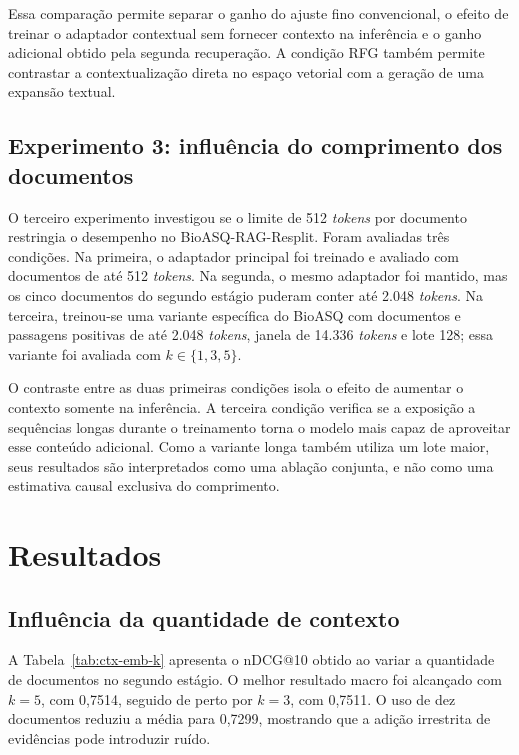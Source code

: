 Essa comparação permite separar o ganho do ajuste fino convencional, o efeito de treinar o adaptador contextual sem fornecer contexto na inferência e o ganho adicional obtido pela segunda recuperação. A condição RFG também permite contrastar a contextualização direta no espaço vetorial com a geração de uma expansão textual.

\subsection{Experimento 3: influência do comprimento dos documentos}

O terceiro experimento investigou se o limite de 512 \textit{tokens} por documento restringia o desempenho no BioASQ-RAG-Resplit. Foram avaliadas três condições. Na primeira, o adaptador principal foi treinado e avaliado com documentos de até 512 \textit{tokens}. Na segunda, o mesmo adaptador foi mantido, mas os cinco documentos do segundo estágio puderam conter até 2.048 \textit{tokens}. Na terceira, treinou-se uma variante específica do BioASQ com documentos e passagens positivas de até 2.048 \textit{tokens}, janela de 14.336 \textit{tokens} e lote 128; essa variante foi avaliada com $k\in\{1,3,5\}$.

O contraste entre as duas primeiras condições isola o efeito de aumentar o contexto somente na inferência. A terceira condição verifica se a exposição a sequências longas durante o treinamento torna o modelo mais capaz de aproveitar esse conteúdo adicional. Como a variante longa também utiliza um lote maior, seus resultados são interpretados como uma ablação conjunta, e não como uma estimativa causal exclusiva do comprimento.

\section{Resultados}
\label{sec:ctx-emb-resultados}

\subsection{Influência da quantidade de contexto}

A Tabela~\ref{tab:ctx-emb-k} apresenta o nDCG@10 obtido ao variar a quantidade de documentos no segundo estágio. O melhor resultado macro foi alcançado com $k=5$, com 0,7514, seguido de perto por $k=3$, com 0,7511. O uso de dez documentos reduziu a média para 0,7299, mostrando que a adição irrestrita de evidências pode introduzir ruído.

